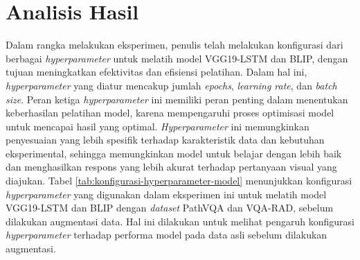 \section{Analisis Hasil}

\par Dalam rangka melakukan eksperimen, penulis telah melakukan konfigurasi dari berbagai \textit{hyperparameter} untuk melatih model VGG19-LSTM dan BLIP, dengan tujuan meningkatkan efektivitas dan efisiensi pelatihan. Dalam hal ini, \textit{hyperparameter} yang diatur mencakup jumlah \textit{epochs}, \textit{learning rate}, dan \textit{batch size}. Peran ketiga \textit{hyperparameter} ini memiliki peran penting dalam menentukan keberhasilan pelatihan model, karena mempengaruhi proses optimisasi model untuk mencapai hasil yang optimal. \textit{Hyperparameter} ini memungkinkan penyesuaian yang lebih spesifik terhadap karakteristik data dan kebutuhan eksperimental, sehingga memungkinkan model untuk belajar dengan lebih baik dan menghasilkan respons yang lebih akurat terhadap pertanyaan visual yang diajukan. Tabel \ref{tab:konfigurasi-hyperparameter-model} menunjukkan konfigurasi \textit{hyperparameter} yang digunakan dalam eksperimen ini untuk melatih model VGG19-LSTM dan BLIP dengan \textit{dataset} PathVQA dan VQA-RAD, sebelum dilakukan augmentasi data. Hal ini dilakukan untuk melihat pengaruh konfigurasi \textit{hyperparameter} terhadap performa model pada data asli sebelum dilakukan augmentasi.
  
